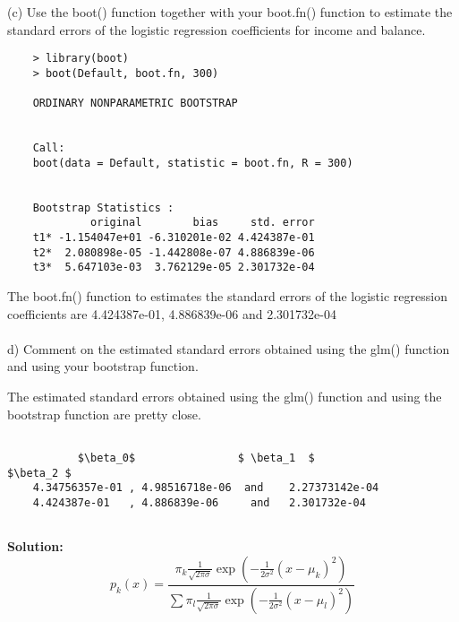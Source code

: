 \documentclass{article}
\begin{document}
(c) Use the boot() function together with your boot.fn() function to estimate the standard errors of the logistic regression coefficients for income and balance.

\begin{program}
	\begin{verbatim}
	> library(boot)
	> boot(Default, boot.fn, 300)
	
	ORDINARY NONPARAMETRIC BOOTSTRAP
	
	
	Call:
	boot(data = Default, statistic = boot.fn, R = 300)
	
	
	Bootstrap Statistics :
	         original        bias     std. error
	t1* -1.154047e+01 -6.310201e-02 4.424387e-01
	t2*  2.080898e-05 -1.442808e-07 4.886839e-06
	t3*  5.647103e-03  3.762129e-05 2.301732e-04
	\end{verbatim}
\end{program}

The boot.fn() function to estimates the standard errors of the logistic regression coefficients are 4.424387e-01, 4.886839e-06 and 2.301732e-04 \\
\\

d) Comment on the estimated standard errors obtained using the glm() function and using your bootstrap function.


The estimated standard errors obtained using the glm() function and using the bootstrap function are pretty close.
 
 \begin{program}
 	\begin{lstlisting}
 	
 	       $\beta_0$                $ \beta_1  $                     $\beta_2 $
	4.34756357e-01 , 4.98516718e-06  and    2.27373142e-04 
	4.424387e-01   , 4.886839e-06     and   2.301732e-04
	 	
 	\end{lstlisting}
 \end{program}
 
\newpage












{\bf Solution:}
\begin{equation}
p_k(x) = \frac{ \pi_k \frac{1} {\sqrt{2\pi \sigma} }  \exp(- \frac{1}{2 \sigma^2} (x -\mu_k )^2 ) } 
                { \sum \pi_l  \frac{1} {\sqrt{2\pi \sigma} }  \exp(- \frac{1}{2 \sigma^2} (x -\mu_l )^2 ) }                 
\end{equation}

\begin{program}
	\begin{verbatim}

   	\end{verbatim}
\end{program}

\newpage
\end{document}
